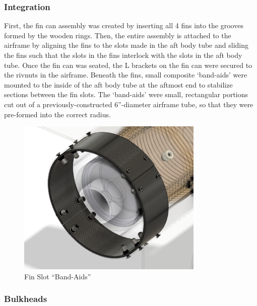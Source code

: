 \subsubsection*{Integration}
First, the fin can assembly was created by inserting all 4 fins into the grooves formed by the wooden rings. Then, the entire assembly is attached to the airframe by aligning the fins to the slots made in the aft body tube and sliding the fins such that the slots in the fins interlock with the slots in the aft body tube. Once the fin can was seated, the L brackets on the fin can were secured to the rivnuts in the airframe.  Beneath the fins, small composite ‘band-aids’ were mounted to the inside of the aft body tube at the aftmost end to stabilize sections between the fin slots. The ‘band-aids’ were small, rectangular portions cut out of a previously-constructed 6”-diameter airframe tube, so that they were pre-formed into the correct radius.
\begin{figure}[H]
	\centering
	\includegraphics[width=3.5in]{imgs/finslotdetail.png}
	\caption{Fin Slot ``Band-Aids''}
	\label{fig:finslot}
\end{figure}
\subsubsection{Bulkheads}
